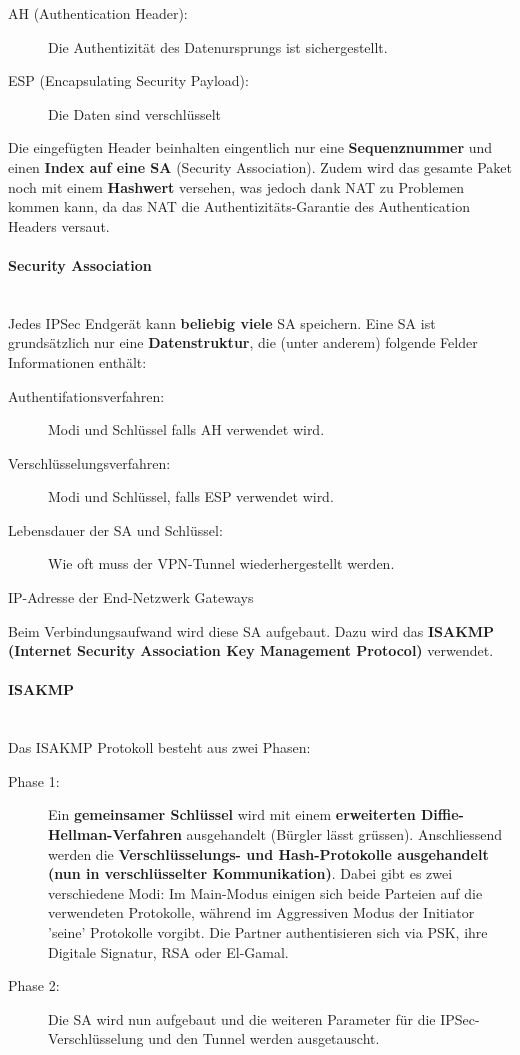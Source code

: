\documentclass[a4paper, 11pt]{article}
\begin{document}
\begin{description}
	\item[AH (Authentication Header): ] Die Authentizität des Datenursprungs ist sichergestellt.
	\item[ESP (Encapsulating Security Payload): ] Die Daten sind verschlüsselt
\end{description}

Die eingefügten Header beinhalten eingentlich nur eine \textbf{Sequenznummer} und einen \textbf{Index auf eine SA} (Security Association). Zudem wird das gesamte Paket noch mit einem \textbf{Hashwert} versehen, was jedoch dank NAT zu Problemen kommen kann, da das NAT die Authentizitäts-Garantie des Authentication Headers versaut.

\paragraph{Security Association} \mbox{} \\
Jedes IPSec Endgerät kann \textbf{beliebig viele} SA speichern. Eine SA ist grundsätzlich nur eine \textbf{Datenstruktur}, die (unter anderem) folgende Felder Informationen enthält:

\begin{description}
	\item[Authentifationsverfahren: ] Modi und Schlüssel falls AH verwendet wird.
	\item[Verschlüsselungsverfahren: ] Modi und Schlüssel, falls ESP verwendet wird.
	\item[Lebensdauer der SA und Schlüssel: ] Wie oft muss der VPN-Tunnel wiederhergestellt werden.
	\item[IP-Adresse der End-Netzwerk Gateways]
\end{description}

\noindent Beim Verbindungsaufwand wird diese SA aufgebaut. Dazu wird das \textbf{ISAKMP (Internet Security Association Key Management Protocol)} verwendet. 

\paragraph{ISAKMP}\mbox{} \\
Das ISAKMP Protokoll besteht aus zwei Phasen:
\begin{description}
	\item[Phase 1: ] Ein \textbf{gemeinsamer Schlüssel} wird mit einem \textbf{erweiterten Diffie-Hellman-Verfahren} ausgehandelt (Bürgler lässt grüssen). Anschliessend werden die \textbf{Verschlüsselungs- und Hash-Protokolle ausgehandelt (nun in verschlüsselter Kommunikation)}. Dabei gibt es zwei verschiedene Modi: Im Main-Modus einigen sich beide Parteien auf die verwendeten Protokolle, während im Aggressiven Modus der Initiator 'seine' Protokolle vorgibt. Die Partner authentisieren sich via PSK, ihre Digitale Signatur, RSA oder El-Gamal.
	\item[Phase 2: ] Die SA wird nun aufgebaut und die weiteren Parameter für die IPSec-Verschlüsselung und den Tunnel werden ausgetauscht.
\end{description}
\end{document}
